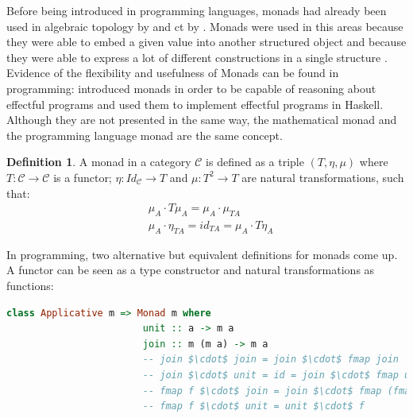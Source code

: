 \documentclass[
  oneside,
  11pt, a4paper,
  footinclude=true,
  headinclude=true,
  cleardoublepage=empty
]{scrbook}
\theoremstyle{definition}
\newtheorem{definition}{Definition}[section]
\theoremstyle{definition}
\begin{document}
	 Before being introduced in programming languages, monads had already been used in algebraic topology by \cite{godement1958topologie} and \gls{ct} by \cite{maclane:71}. Monads were used in this areas because they were able to embed a given value into another structured object and because they were able to express a lot of different constructions in a single structure \citep{DBLP:journals/corr/abs-1803-10195}. Evidence of the flexibility and usefulness of Monads can be found in programming: \cite{Moggi:1991:NCM:116981.116984} introduced monads in order to be capable of reasoning about effectful programs and \cite{1995_wadler_monads} used them to implement effectful programs in Haskell. Although they are not presented in the same way, the mathematical monad and the programming language monad are the same concept.
	            
	            \begin{definition}{A monad in a category $\mathscr{C}$ is defined as a triple $(T,\eta, \mu)$ where $T : \mathscr{C} \rightarrow \mathscr{C}$ is a functor; $\eta : Id_\mathscr{C} \rightarrow T$ and $\mu : T^2 \rightarrow T$ are natural transformations, such that:}
	                \begin{align*}
	                    &\mu_A \cdot T\mu_A = \mu_A \cdot \mu_{TA} \\
	                    &\mu_A \cdot \eta_{TA} = id_{TA} = \mu_A \cdot T\eta_A
	                \end{align*}{}
	            \end{definition}
	            
	            In programming, two alternative but equivalent definitions for monads come up. A functor can be seen as a type constructor and natural transformations as functions:
	            
	            \begin{lstlisting}[mathescape, language=Haskell, caption={Monad laws and definition in terms of \texttt{unit} and \texttt{join}},captionpos=b]
	                class Applicative m => Monad m where
	                    unit :: a -> m a
	                    join :: m (m a) -> m a
	                    -- join $\cdot$ join = join $\cdot$ fmap join
	                    -- join $\cdot$ unit = id = join $\cdot$ fmap unit
	                    -- fmap f $\cdot$ join = join $\cdot$ fmap (fmap f)
	                    -- fmap f $\cdot$ unit = unit $\cdot$ f
	            \end{lstlisting}{}
	            
\end{document}
